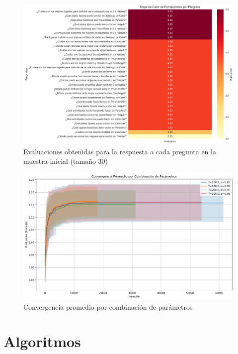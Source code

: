 \documentclass[10pt]{llncs}
\begin{document}
\begin{figure}
\centering
\includegraphics[width=1\textwidth]{../src/experiments/specialized_agents/quality_heatmap_20250617-171856.png}
\caption{Evaluaciones obtenidas para la respuesta a cada pregunta en la muestra inicial (tamaño 30)}
\label{fig:eval_2}
\end{figure}
\begin{figure}[H]
\centering
\includegraphics[width=1\textwidth]{../src/experiments/algorithm_exp/avg_convergence_20250620-190453.png}
\caption{Convergencia promedio por combinación de parámetros}
\label{fig:avg_convergence}
\end{figure}

\newpage
\section{Algoritmos}
\end{document}
